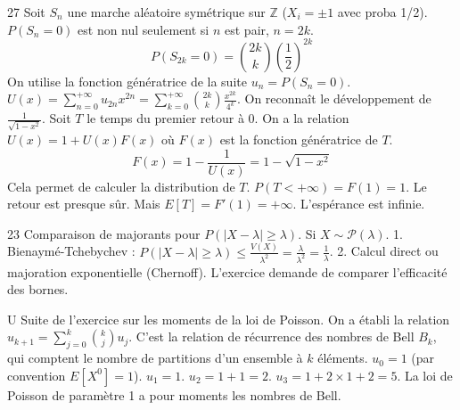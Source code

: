 \begin{correction}{27}
Soit $S_n$ une marche aléatoire symétrique sur $\mathbb{Z}$ ($X_i = \pm 1$ avec proba 1/2).
$P(S_n = 0)$ est non nul seulement si $n$ est pair, $n=2k$.
$$ P(S_{2k} = 0) = \binom{2k}{k} \left(\frac{1}{2}\right)^{2k} $$
On utilise la fonction génératrice de la suite $u_n = P(S_n=0)$.
$U(x) = \sum_{n=0}^{+ \infty} u_{2n} x^{2n} = \sum_{k=0}^{+ \infty} \binom{2k}{k} \frac{x^{2k}}{4^k}$.
On reconnaît le développement de $\frac{1}{\sqrt{1-x^2}}$.
Soit $T$ le temps du premier retour à 0.
On a la relation $U(x) = 1 + U(x) F(x)$ où $F(x)$ est la fonction génératrice de $T$.
$$ F(x) = 1 - \frac{1}{U(x)} = 1 - \sqrt{1-x^2} $$
Cela permet de calculer la distribution de $T$.
$P(T < + \infty) = F(1) = 1$. Le retour est presque sûr.
Mais $E[T] = F'(1) = + \infty$. L'espérance est infinie.
\end{correction}

\begin{correction}{23}
Comparaison de majorants pour $P(|X-\lambda| \ge \lambda)$.
Si $X \sim \mathcal{P}(\lambda)$.
1. Bienaymé-Tchebychev : $P(|X-\lambda| \ge \lambda) \le \frac{V(X)}{\lambda^2} = \frac{\lambda}{\lambda^2} = \frac{1}{\lambda}$.
2. Calcul direct ou majoration exponentielle (Chernoff).
L'exercice demande de comparer l'efficacité des bornes.
\end{correction}

\begin{correction}{U}
Suite de l'exercice sur les moments de la loi de Poisson.
On a établi la relation $u_{k+1} = \sum_{j=0}^k \binom{k}{j} u_j$.
C'est la relation de récurrence des nombres de Bell $B_k$, qui comptent le nombre de partitions d'un ensemble à $k$ éléments.
$u_0 = 1$ (par convention $E[X^0]=1$).
$u_1 = 1$.
$u_2 = 1 + 1 = 2$.
$u_3 = 1 + 2\times 1 + 2 = 5$.
La loi de Poisson de paramètre 1 a pour moments les nombres de Bell.
\end{correction}

